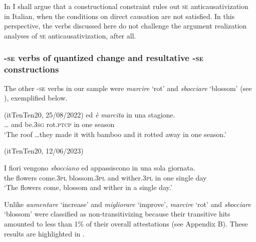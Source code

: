 \documentclass[output=paper,colorlinks,citecolor=brown
]{langscibook}
\begin{document}
In  I shall argue that a constructional constraint rules out \textsc{se} anticausativization in Italian, when the conditions on direct causation are not satisfied. In this perspective, the verbs discussed here do not challenge the argument realization analyses of \textsc{se} anticausativization, after all.

\subsubsection{-\textsc{se} verbs of quantized change and resultative -\textsc{se} constructions}
\label{bentley_section_3.3.2}

The other -\textsc{se} verbs in our sample were \textit{marcire} ‘rot’ and \textit{sbocciare} ‘blossom’ (see ), exemplified below.

\hspace*{\fill}(itTenTen20, 25/08/2022)\quad
\ea \label{bentley_example_14}
    ed		\textit{è} 					\textit{marcita}	in	una	stagione.  \\
 {\ldots} 				and	be.3\textsc{sg}	rot.\textsc{ptcp}		in	one	season \\
    \glt 			‘The roof  \ldots  they made it with bamboo and it rotted away in one season.’
\z



\hspace*{\fill}(itTenTen20, 12/06/2023)\quad

\ea \label{bentley_example_15}
    \gll I			fiori				vengono		\textit{sbocciano}				ed		appassiscono	in 	una sola			giornata. \\
 the	flowers	come.3\textsc{pl}		blossom.3\textsc{pl}	and	wither.3\textsc{pl}				in		one	single	day \\
    \glt 				‘The flowers come, blossom and wither in a single day.’
\z

Unlike \textit{aumentare} ‘increase’ and \textit{migliorare} ‘improve’, \textit{marcire} ‘rot’ and \textit{sbocciare} ‘blossom’ were classified as non-transitivizing because their transitive hits amounted to less than 1\% of their overall attestations (see Appendix B). These results are highlighted in .
\end{document}
